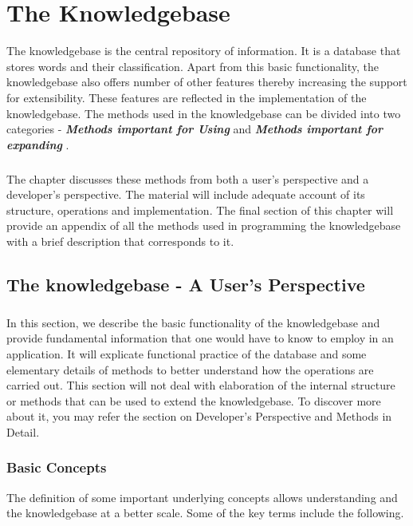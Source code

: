 \chapter{The Knowledgebase}

The knowledgebase is the central repository of information. It is a database that stores words and their classification. Apart from this basic functionality, the knowledgebase also offers number of other features thereby increasing the support for extensibility.
These features are reflected in the implementation of the knowledgebase. The methods used in the knowledgebase can be divided into two categories - \textbf{\emph{Methods important for Using \libalf}} and \textbf{\emph{Methods important for expanding \libalf}}. 
\paragraph{}
The chapter discusses these methods from both a user's perspective and a developer's perspective. The material will include adequate account of its structure, operations and implementation.  The final section of this chapter will provide an appendix of all the methods used in programming the knowledgebase with a brief description that corresponds to it.  
\vskip 1pt

\section{The knowledgebase - A User's Perspective}

\paragraph{} In this section, we describe the basic functionality of the knowledgebase and provide fundamental information that one would have to know to employ \libalf in an application. It will explicate functional practice of the database and some elementary details of methods to better understand how the operations are carried out. This section will not deal with elaboration of the internal structure or methods that can be used to extend the knowledgebase. To discover more about it, you may refer the section on Developer's Perspective and Methods in Detail.

\subsection*{Basic Concepts}
	
	The definition of some important underlying concepts allows understanding \libalf and the knowledgebase at a better scale. Some of the key terms include the following.

